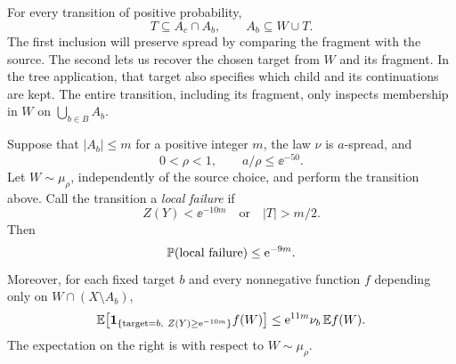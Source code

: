 For every transition of positive probability,
\begin{equation}\label{eq:two-inclusions}
 T\subseteq A_c\cap A_b,
 \qquad A_b\subseteq W\cup T.
\end{equation}
The first inclusion will preserve spread by comparing the fragment
with the source. The second lets us recover the chosen target from
$W$ and its fragment. In the tree application, that target also
specifies which child and its continuations are kept.
The entire transition, including its fragment, only inspects
membership in $W$ on $\bigcup_{b\in B}A_b$.

\begin{lemma}\label{lem:local}
Suppose that $|A_b|\le m$ for a positive integer $m$, the law $\nu$
is $a$-spread, and
\[
 0<\rho<1,\qquad a/\rho\le\ee^{-50}.
\]
Let $W\sim\mu_\rho$, independently of the source choice, and perform
the transition above. Call the transition a \emph{local failure} if
\[
 Z(Y)<\ee^{-10m}\quad\text{or}\quad |T|>m/2.
\]
Then
\begin{equation}\label{eq:local-failure}
 \mathbb P(\text{local failure})\le\mathrm e^{-9m}.
\end{equation}
Moreover, for each fixed target $b$ and every nonnegative function
$f$ depending only on $W\cap(X\setminus A_b)$,
\begin{equation}\label{eq:distortion}
 \mathbb E\!\left[
  \mathbf 1_{\{\mathrm{target}=b,\ Z(Y)\ge\mathrm e^{-10m}\}} f(W)
 \right]
 \le \mathrm e^{11m}\nu_b\,\mathbb E f(W).
\end{equation}
The expectation on the right is with respect to $W\sim\mu_\rho$.
\end{lemma}

